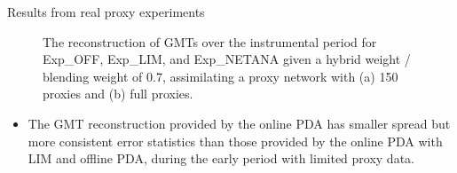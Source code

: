 \documentclass[final]{beamer}
\newlength{\colwidth}
\begin{document}
\begin{frame}[t]
\begin{columns}[t]
\begin{column}{\colwidth}
\begin{alertblock}{Results from real proxy experiments}
\begin{figure}
\begin{minipage}[t]{0.8\textwidth}
\begin{minipage}[t]{0.49\textwidth}
\begin{tikzpicture}
                                \end{tikzpicture}
                            \end{minipage}
                            \begin{minipage}[t]{0.49\textwidth}
                            \end{minipage}    
                            \caption{The reconstruction of GMTs over the instrumental period for Exp\_OFF, Exp\_LIM, and Exp\_NETANA given a hybrid weight / blending weight of 0.7, assimilating a proxy network with (a) 150 proxies and (b) full proxies.}
                            \label{fig5}
                        \end{minipage}
                    \end{figure}
                    \begin{itemize}
                        \item The GMT reconstruction provided by the online PDA has smaller spread but more consistent error statistics than those provided by the online PDA with LIM and offline PDA, during the early period with limited proxy data.
                    \end{itemize}

\end{alertblock}
\end{column}
\end{columns}
\end{frame}
\end{document}

